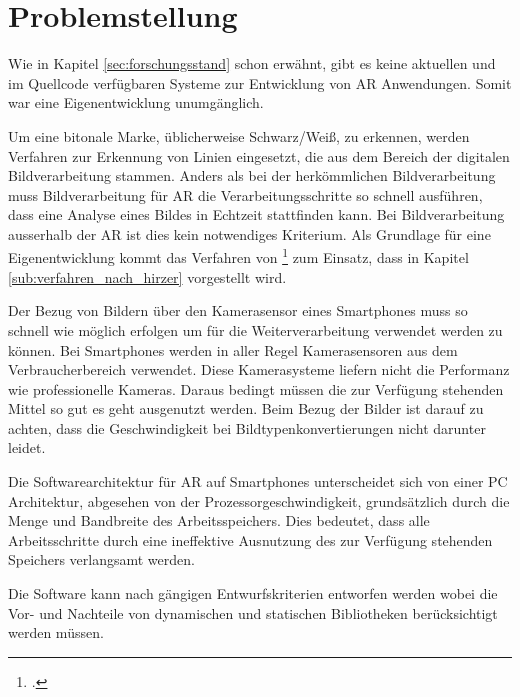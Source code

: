 \section{Problemstellung} %
\label{sec:problemstellung}
\begin{comment}
	Problemstellung: Problemstellung und Frage im Detail erläutern
\end{comment}

Wie in Kapitel \ref{sec:forschungsstand} schon erwähnt, gibt es keine aktuellen und im Quellcode verfügbaren Systeme zur Entwicklung von \gls{AR} Anwendungen. Somit war eine Eigenentwicklung unumgänglich.

Um eine bitonale Marke, üblicherweise Schwarz/Weiß, zu erkennen, werden Verfahren zur Erkennung von Linien eingesetzt, die aus dem Bereich der digitalen Bildverarbeitung stammen. Anders als bei der herkömmlichen Bildverarbeitung muss Bildverarbeitung für \gls{AR} die Verarbeitungsschritte so schnell ausführen, dass eine Analyse eines Bildes in Echtzeit stattfinden kann. Bei Bildverarbeitung ausserhalb der \gls{AR} ist dies kein notwendiges Kriterium. Als Grundlage für eine Eigenentwicklung kommt das Verfahren von \citeauthor{clarke96}\footcite{clarke96} zum Einsatz, dass in Kapitel \ref{sub:verfahren_nach_hirzer} vorgestellt wird.

Der Bezug von Bildern über den Kamerasensor eines Smartphones muss so schnell wie möglich erfolgen um für die Weiterverarbeitung verwendet werden zu können. Bei Smartphones werden in aller Regel Kamerasensoren aus dem Verbraucherbereich verwendet. Diese Kamerasysteme liefern nicht die Performanz wie professionelle Kameras. Daraus bedingt müssen die zur Verfügung stehenden Mittel so gut es geht ausgenutzt werden. Beim Bezug der Bilder ist darauf zu achten, dass die Geschwindigkeit bei Bildtypenkonvertierungen nicht darunter leidet.

Die Softwarearchitektur für \gls{AR} auf Smartphones unterscheidet sich von einer PC Architektur, abgesehen von der Prozessorgeschwindigkeit, grundsätzlich durch die Menge und Bandbreite des Arbeitsspeichers. Dies bedeutet, dass alle Arbeitsschritte durch eine ineffektive Ausnutzung des zur Verfügung stehenden Speichers verlangsamt werden.

Die Software kann nach gängigen Entwurfskriterien entworfen werden wobei die Vor- und Nachteile von dynamischen und statischen Bibliotheken berücksichtigt werden müs\-sen.

